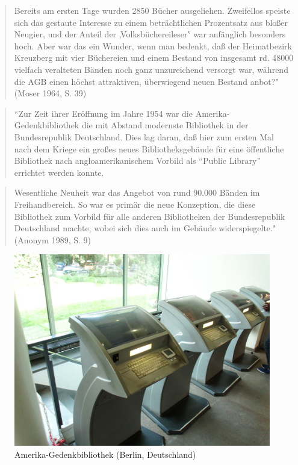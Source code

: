 \documentclass[a4paper,
fontsize=11pt,
oneside,
numbers=noperiodatend,
parskip=half-,
bibliography=totoc,
final
]{scrartcl}
\begin{document}
\begin{quote}
Bereits am ersten Tage wurden 2850 Bücher ausgeliehen. Zweifellos
speiste sich das gestaute Interesse zu einem beträchtlichen Prozentsatz
aus bloßer Neugier, und der Anteil der ‚Volksbüchereileser‛ war
anfänglich besonders hoch. Aber war das ein Wunder, wenn man bedenkt,
daß der Heimatbezirk Kreuzberg mit vier Büchereien und einem Bestand von
insgesamt rd. 48000 vielfach veralteten Bänden noch ganz unzureichend
versorgt war, während die AGB einen höchst attraktiven, überwiegend
neuen Bestand anbot?" (Moser 1964, S. 39)
\end{quote}

\begin{quote}
``Zur Zeit ihrer Eröffnung im Jahre 1954 war die
Amerika-Gedenkbibliothek die mit Abstand modernste Bibliothek in der
Bundesrepublik Deutschland. Dies lag daran, daß hier zum ersten Mal nach
dem Kriege ein großes neues Bibliotheksgebäude für eine öffentliche
Bibliothek nach angloamerikanischem Vorbild als \enquote{Public Library}
errichtet werden konnte.
\end{quote}

\begin{quote}
Wesentliche Neuheit war das Angebot von rund 90.000 Bänden im
Freihandbereich. So war es primär die neue Konzeption, die diese
Bibliothek zum Vorbild für alle anderen Bibliotheken der Bundesrepublik
Deutschland machte, wobei sich dies auch im Gebäude widerspiegelte."
(Anonym 1989, S. 9)
\end{quote}

\begin{figure}[htbp]
\centering
\includegraphics{./img/022.jpg}
\caption{Amerika-Gedenkbibliothek (Berlin,
Deutschland)}
\end{figure}
\end{document}
